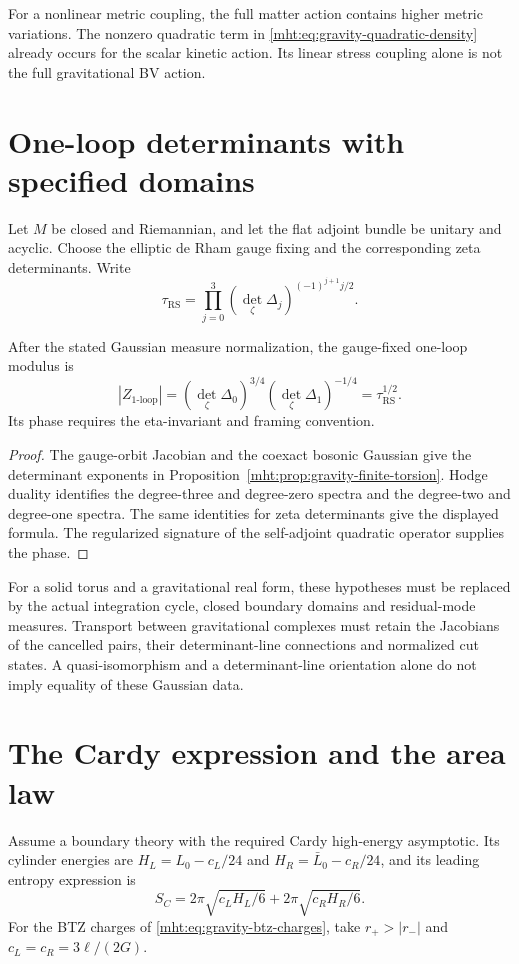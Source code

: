 For a nonlinear metric coupling, the full matter action
contains higher metric variations.
The nonzero quadratic term in
\eqref{mht:eq:gravity-quadratic-density} already occurs for
the scalar kinetic action.
Its linear stress coupling alone is not the full gravitational
BV action.

\chapter{One-loop determinants with specified domains}
Let $M$ be closed and Riemannian, and let the flat adjoint
bundle be unitary and acyclic.
Choose the elliptic de Rham gauge fixing and the corresponding
zeta determinants.
Write
\[
 \tau_{\mathrm{RS}}
 =\prod_{j=0}^3(\det_\zeta\Delta_j)^{(-1)^{j+1}j/2}.
\]

\begin{theorem}
After the stated Gaussian measure normalization, the
gauge-fixed one-loop modulus is
\[
 |Z_{1\text{-loop}}|
 =(\det_\zeta\Delta_0)^{3/4}
       (\det_\zeta\Delta_1)^{-1/4}
 =\tau_{\mathrm{RS}}^{1/2}.
\]
Its phase requires the eta-invariant and framing convention.
\end{theorem}
\begin{proof}
The gauge-orbit Jacobian and the coexact bosonic Gaussian
give the determinant exponents in
Proposition~\ref{mht:prop:gravity-finite-torsion}.
Hodge duality identifies the degree-three and degree-zero
spectra and the degree-two and degree-one spectra.
The same identities for zeta determinants give the displayed
formula.
The regularized signature of the self-adjoint quadratic
operator supplies the phase.
\end{proof}

For a solid torus and a gravitational real form, these
hypotheses must be replaced by the actual integration cycle,
closed boundary domains and residual-mode measures.
Transport between gravitational complexes must retain the
Jacobians of the cancelled pairs, their determinant-line
connections and normalized cut states.
A quasi-isomorphism and a determinant-line orientation alone
do not imply equality of these Gaussian data.

\chapter{The Cardy expression and the area law}
Assume a boundary theory with the required Cardy
high-energy asymptotic.
Its cylinder energies are $H_L=L_0-c_L/24$ and
$H_R=\bar L_0-c_R/24$, and its leading entropy expression is
\[
 S_C=2\pi\sqrt{c_LH_L/6}+2\pi\sqrt{c_RH_R/6}.
\]
For the BTZ charges of
\eqref{mht:eq:gravity-btz-charges}, take $r_+>|r_-|$ and
$c_L=c_R=3\ell/(2G)$.

